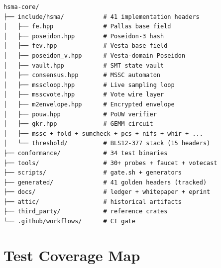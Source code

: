 \documentclass[11pt, a4paper]{article}
\theoremstyle{plain}
\theoremstyle{definition}
\theoremstyle{remark}
\begin{document}
\begin{lstlisting}[style=bashstyle]
hsma-core/
├── include/hsma/           # 41 implementation headers
│   ├── fe.hpp              # Pallas base field
│   ├── poseidon.hpp        # Poseidon-3 hash
│   ├── fev.hpp             # Vesta base field
│   ├── poseidon_v.hpp      # Vesta-domain Poseidon
│   ├── vault.hpp           # SMT state vault
│   ├── consensus.hpp       # MSSC automaton
│   ├── msscloop.hpp        # Live sampling loop
│   ├── msscvote.hpp        # Vote wire layer
│   ├── m2envelope.hpp      # Encrypted envelope
│   ├── pouw.hpp            # PoUW verifier
│   ├── gkr.hpp             # GEMM circuit
│   ├── mssc + fold + sumcheck + pcs + nifs + whir + ...
│   └── threshold/          # BLS12-377 stack (15 headers)
├── conformance/            # 34 test binaries
├── tools/                  # 30+ probes + faucet + votecast
├── scripts/                # gate.sh + generators
├── generated/              # 41 golden headers (tracked)
├── docs/                   # ledger + whitepaper + eprint
├── attic/                  # historical artifacts
├── third_party/            # reference crates
└── .github/workflows/      # CI gate
\end{lstlisting}

\section{Test Coverage Map}
\end{document}
